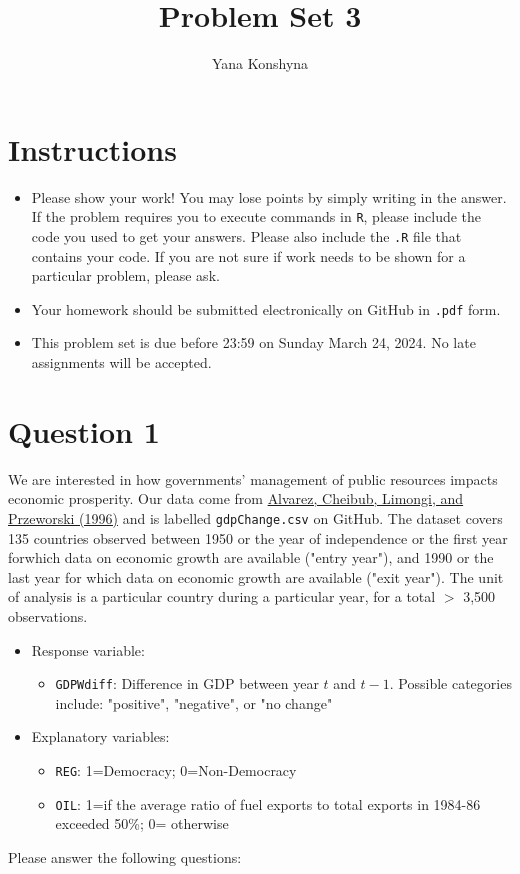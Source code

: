 \documentclass[12pt,letterpaper]{article}
\title{Problem Set 3}
\author{Yana Konshyna}
\begin{document}
	\maketitle
	\section*{Instructions}
	\begin{itemize}
	\item Please show your work! You may lose points by simply writing in the answer. If the problem requires you to execute commands in \texttt{R}, please include the code you used to get your answers. Please also include the \texttt{.R} file that contains your code. If you are not sure if work needs to be shown for a particular problem, please ask.
\item Your homework should be submitted electronically on GitHub in \texttt{.pdf} form.
\item This problem set is due before 23:59 on Sunday March 24, 2024. No late assignments will be accepted.
	\end{itemize}

	\vspace{.25cm}
\section*{Question 1}
\vspace{.25cm}
\noindent We are interested in how governments' management of public resources impacts economic prosperity. Our data come from \href{https://www.researchgate.net/profile/Adam_Przeworski/publication/240357392_Classifying_Political_Regimes/links/0deec532194849aefa000000/Classifying-Political-Regimes.pdf}{Alvarez, Cheibub, Limongi, and Przeworski (1996)} and is labelled \texttt{gdpChange.csv} on GitHub. The dataset covers 135 countries observed between 1950 or the year of independence or the first year forwhich data on economic growth are available ("entry year"), and 1990 or the last year for which data on economic growth are available ("exit year"). The unit of analysis is a particular country during a particular year, for a total $>$ 3,500 observations. 

\begin{itemize}
	\item
	Response variable: 
	\begin{itemize}
		\item \texttt{GDPWdiff}: Difference in GDP between year $t$ and $t-1$. Possible categories include: "positive", "negative", or "no change"
	\end{itemize}
	\item
	Explanatory variables: 
	\begin{itemize}
		\item
		\texttt{REG}: 1=Democracy; 0=Non-Democracy
		\item
		\texttt{OIL}: 1=if the average ratio of fuel exports to total exports in 1984-86 exceeded 50\%; 0= otherwise
	\end{itemize}
	
\end{itemize}
\newpage
\noindent Please answer the following questions:
\end{document}
